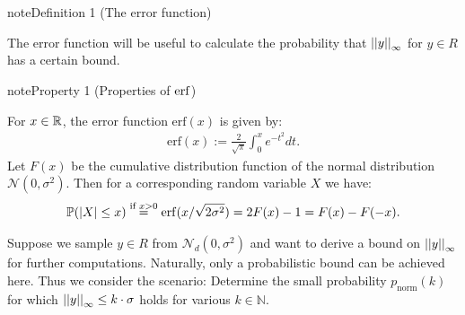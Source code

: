 \documentclass[letterpaper,10pt,english]{jupyterBook}
\begin{document}
\begin{DUlineblock}{0em}
\item[] 
\end{DUlineblock}
\label{Thesis:error-function}
\begin{sphinxadmonition}{note}{Definition 1 (The error function)}
\end{sphinxadmonition}

\sphinxAtStartPar
The error function will be useful to calculate the probability that \(\left\lvert\left\lvert y \right\rvert\right\rvert_\infty\) for \(y\in R\) has a certain bound.
\label{Thesis:property-error-function}
\begin{sphinxadmonition}{note}{Property 1 (Properties of \protect\(\mathrm{erf}\protect\))}
\end{sphinxadmonition}

\sphinxAtStartPar
For \(x \in \mathbb R\), the error function \(\mathrm{erf}(x)\) is given by:
\begin{equation*}
\begin{split}\mathrm{erf}(x) := \frac{2}{\sqrt{\pi}} \int_0^x e^{-t^2}dt.\end{split}
\end{equation*}
\sphinxAtStartPar
Let \(F(x)\) be the cumulative distribution function of the normal distribution \(\mathcal N(0, \sigma^2)\). Then for a corresponding random variable \(X\) we have:
\begin{equation*}
\begin{split}\mathbb P(\left\lvert X \right\rvert \le x) \overset{\text{if } x > 0}{=} \mathrm{erf}(x/\sqrt{2\sigma^2}) = 2F(x) -1 = F(x) - F(-x).\end{split}
\end{equation*}
\begin{DUlineblock}{0em}
\item[] 
\end{DUlineblock}

\sphinxAtStartPar
Suppose we sample \(y \in R\) from \(\mathcal N_d(0,\sigma^2)\) and want to derive a bound on \(\left\lvert\left\lvert y \right\rvert\right\rvert_\infty\) for further computations.
Naturally, only a probabilistic bound can be achieved here.
Thus we consider the scenario: Determine the small probability \(p_{\text{norm}}(k)\) for which \(\left\lvert\left\lvert y \right\rvert\right\rvert_\infty \le k\cdot \sigma\) holds for various \(k \in \mathbb N\).
\end{document}
